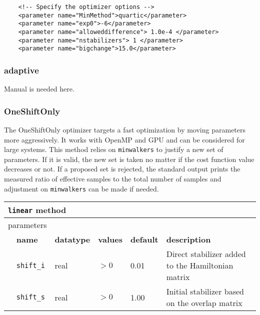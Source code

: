 \begin{lstlisting}
    <!-- Specify the optimizer options -->
    <parameter name="MinMethod">quartic</parameter>
    <parameter name="exp0">-6</parameter>
    <parameter name="alloweddifference"> 1.0e-4 </parameter>
    <parameter name="nstabilizers"> 1 </parameter>
    <parameter name="bigchange">15.0</parameter>
\end{lstlisting}

\subsubsection{adaptive}

Manual is needed here.

\subsubsection{OneShiftOnly}
The OneShiftOnly optimizer targets a fast optimization by moving parameters more aggressively. It works with OpenMP and GPU and can be considered for large systems.
This method relies on \texttt{minwalkers} to justify a new set of parameters. If it is valid, the new set is taken no matter if the cost function value decreases or not.
If a proposed set is rejected, the standard output prints the measured ratio of effective samples to the total number of samples
and adjustment on \texttt{minwalkers} can be made if needed.

\begin{table}[h]
\begin{center}
\begin{tabularx}{\textwidth}{l l l l l l }
\hline
\multicolumn{6}{l}{\texttt{linear} method} \\
\hline
\multicolumn{2}{l}{parameters}  & \multicolumn{4}{l}{}\\
   &   \bfseries name     & \bfseries datatype & \bfseries values & \bfseries default   & \bfseries description \\
   &   \texttt{shift\_i} &  real     & $>0$ & 0.01 & Direct stabilizer added to the Hamiltonian matrix\\
   &   \texttt{shift\_s} &  real     & $>0$ & 1.00 & Initial stabilizer based on the overlap matrix\\
  \hline
\end{tabularx}
\end{center}
\end{table}

